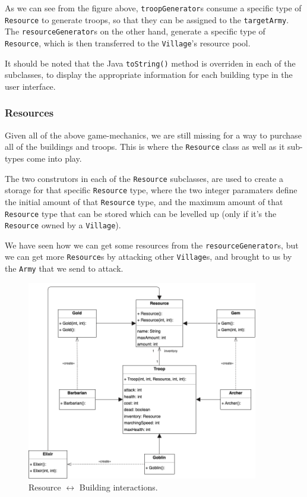\documentclass{article}
\newcommand{\code}[1]{\texttt{#1}}
\begin{document}
As we can see from the figure above, \code{troopGenerator}s consume a specific
type of \code{Resource} to generate troops, so that they can be assigned to the
\code{targetArmy}. The \code{resourceGenerator}s on the other hand,
generate a specific type of \code{Resource}, which is then transferred to the
\code{Village}'s resource pool.

It should be noted that the Java \code{toString()} method is overriden in each
of the subclasses, to display the appropriate information for each building type
in the user interface.

\newpage

\subsubsection*{Resources}

Given all of the above game-mechanics, we are still missing for a way to
purchase all of the buildings and troops. This is where the \code{Resource}
class as well as it sub-types come into play.

The two construtors in each of the \code{Resource} subclasses, are used to create 
a storage for that specific \code{Resource} type, where the two integer
paramaters define the initial amount of that \code{Resource} type, and the
maximum amount of that \code{Resource} type that can be stored which can be
levelled up (only if it's the \code{Resource} owned by a \code{Village}).

We have seen how we can get some resources from the \code{resourceGenerator}s, but 
we can get more \code{Resource}s by attacking other \code{Village}s, and brought
to us by the \code{Army} that we send to attack.



\begin{figure}[h]
	\vspace{1em}
	\centering
	\includegraphics[width=0.9\textwidth]{images/resource-uml.png}
	\caption{Resource $\leftrightarrow$ Building interactions.}
\end{figure}
\end{document}
